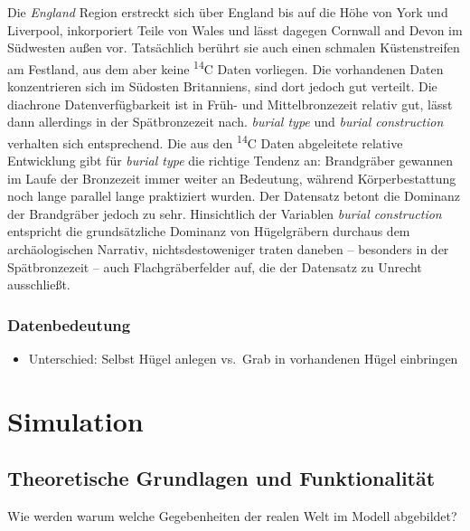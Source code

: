 \documentclass[openany,twoside,twocolumn]{book}
\providecommand{\tightlist}{%
  \setlength{\itemsep}{0pt}\setlength{\parskip}{0pt}}
\begin{document}
Die \emph{England} Region erstreckt sich über England bis auf die Höhe
von York und Liverpool, inkorporiert Teile von Wales und lässt dagegen
Cornwall and Devon im Südwesten außen vor. Tatsächlich berührt sie auch
einen schmalen Küstenstreifen am Festland, aus dem aber keine
\textsuperscript{14}C Daten vorliegen. Die vorhandenen Daten
konzentrieren sich im Südosten Britanniens, sind dort jedoch gut
verteilt. Die diachrone Datenverfügbarkeit ist in Früh- und
Mittelbronzezeit relativ gut, lässt dann allerdings in der
Spätbronzezeit nach. \emph{burial type} und \emph{burial construction}
verhalten sich entsprechend. Die aus den \textsuperscript{14}C Daten
abgeleitete relative Entwicklung gibt für \emph{burial type} die
richtige Tendenz an: Brandgräber gewannen im Laufe der Bronzezeit immer
weiter an Bedeutung, während Körperbestattung noch lange parallel lange
praktiziert wurden. Der Datensatz betont die Dominanz der Brandgräber
jedoch zu sehr. Hinsichtlich der Variablen \emph{burial construction}
entspricht die grundsätzliche Dominanz von Hügelgräbern durchaus dem
archäologischen Narrativ, nichtsdestoweniger traten daneben -- besonders
in der Spätbronzezeit -- auch Flachgräberfelder auf, die der Datensatz
zu Unrecht ausschließt.

\hypertarget{datenbedeutung}{%
\subsubsection{Datenbedeutung}\label{datenbedeutung}}

\begin{itemize}
\tightlist
\item
  Unterschied: Selbst Hügel anlegen vs.~Grab in vorhandenen Hügel
  einbringen
\end{itemize}

\hypertarget{simulation}{%
\section{Simulation}\label{simulation}}

\hypertarget{simulation-theorie}{%
\subsection{Theoretische Grundlagen und
Funktionalität}\label{simulation-theorie}}

Wie werden warum welche Gegebenheiten der realen Welt im Modell
abgebildet?
\end{document}
